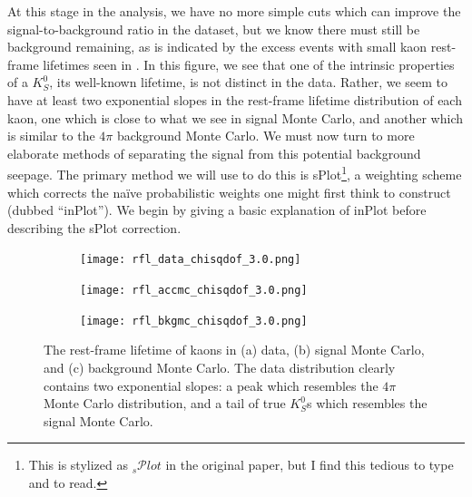 At this stage in the analysis, we have no more simple cuts which can improve the signal-to-background ratio in the dataset, but we know there must still be background remaining, as is indicated by the excess events with small kaon rest-frame lifetimes seen in . In this figure, we see that one of the intrinsic properties of a $K_S^0$, its well-known lifetime, is not distinct in the data. Rather, we seem to have at least two exponential slopes in the rest-frame lifetime distribution of each kaon, one which is close to what we see in signal Monte Carlo, and another which is similar to the $4\pi$ background Monte Carlo. We must now turn to more elaborate methods of separating the signal from this potential background seepage. The primary method we will use to do this is sPlot\cite{pivk_splot_2005}\footnote{This is stylized as ${}_s\mathcal{P}lot$ in the original paper, but I find this tedious to type and to read.}, a weighting scheme which corrects the na\"ive probabilistic weights one might first think to construct (dubbed ``inPlot''). We begin by giving a basic explanation of inPlot before describing the sPlot correction.

\begin{figure}
  \begin{center}
    \begin{subfigure}[b]{.7\columnwidth}
      \texttt{[image: rfl\_data\_chisqdof\_3.0.png]}
      \caption{}
      \label{fig:rfl-data}
    \end{subfigure}
    \begin{subfigure}[b]{.7\columnwidth}
      \texttt{[image: rfl\_accmc\_chisqdof\_3.0.png]}
      \caption{}
      \label{fig:rfl-accmc}
    \end{subfigure}
    \begin{subfigure}[b]{.7\columnwidth}
      \texttt{[image: rfl\_bkgmc\_chisqdof\_3.0.png]}
      \caption{}
      \label{fig:rfl-bkgmc}
    \end{subfigure}
  \end{center}
  \caption{The rest-frame lifetime of kaons in (a) data, (b) signal Monte Carlo, and (c) background Monte Carlo. The data distribution clearly contains two exponential slopes: a peak which resembles the $4\pi$ Monte Carlo distribution, and a tail of true $K_S^0$s which resembles the signal Monte Carlo.}\label{fig:rfl-pre-splot}
\end{figure}

